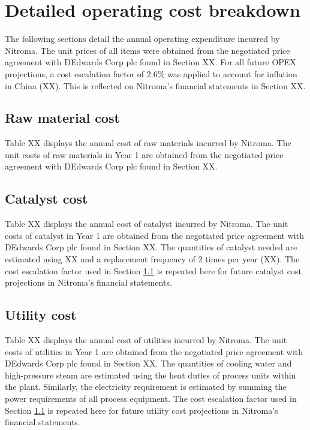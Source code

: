 \section{Detailed operating cost breakdown}
The following sections detail the annual operating expenditure incurred by Nitroma. The unit prices of all items were obtained from the negotiated price agreement with DEdwards Corp plc found in Section XX. For all future OPEX projections, a cost escalation factor of 2.6\% was applied to account for inflation in China (XX). This is reflected on Nitroma’s financial statements in Section XX.
\subsection{Raw material cost}
\label{sec:opex-raw-material}
Table XX displays the annual cost of raw materials incurred by Nitroma. The unit costs of raw materials in Year 1 are obtained from the negotiated price agreement with DEdwards Corp plc found in Section XX. 

\subsection{Catalyst cost}
Table XX displays the annual cost of catalyst incurred by Nitroma. The unit costs of catalyst in Year 1 are obtained from the negotiated price agreement with DEdwards Corp plc found in Section XX. The quantities of catalyst needed are estimated using XX and a replacement frequency of 2 times per year (XX). The cost escalation factor used in Section \ref{sec:opex-raw-material} is repeated here for future catalyst cost projections in Nitroma’s financial statements.  

\subsection{Utility cost}
Table XX displays the annual cost of utilities incurred by Nitroma. The unit costs of utilities in Year 1 are obtained from the negotiated price agreement with DEdwards Corp plc found in Section XX. The quantities of cooling water and high-pressure steam are estimated using the heat duties of process units within the plant. Similarly, the electricity requirement is estimated by summing the power requirements of all process equipment. The cost escalation factor used in Section \ref{sec:opex-raw-material} is repeated here for future utility cost projections in Nitroma’s financial statements.  

